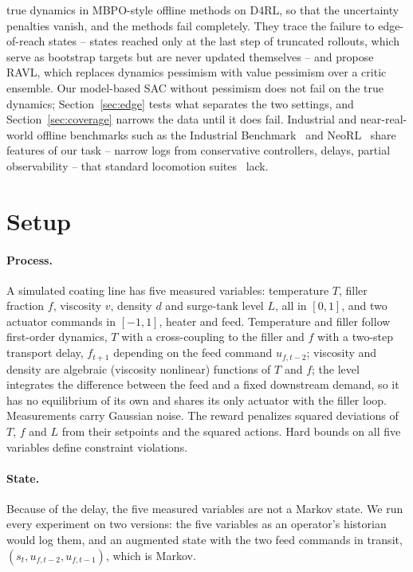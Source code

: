 \documentclass[11pt]{article}
\begin{document}
true dynamics in MBPO-style offline methods on D4RL, so that the uncertainty penalties vanish, and the methods fail completely. They trace the failure to edge-of-reach states -- states reached only at the last step of truncated rollouts, which serve as bootstrap targets but are never updated themselves -- and propose RAVL, which replaces dynamics pessimism with value pessimism over a critic ensemble. Our model-based SAC without pessimism does not fail on the true dynamics; Section~\ref{sec:edge} tests what separates the two settings, and Section~\ref{sec:coverage} narrows the data until it does fail. Industrial and near-real-world offline benchmarks such as the Industrial Benchmark~\citep{hein2017industrial} and NeoRL~\citep{qin2022neorl} share features of our task -- narrow logs from conservative controllers, delays, partial observability -- that standard locomotion suites~\citep{fu2020d4rl} lack.

\section{Setup}

\paragraph{Process.} A simulated coating line has five measured variables: temperature $T$, filler fraction $f$, viscosity $v$, density $d$ and surge-tank level $L$, all in $[0,1]$, and two actuator commands in $[-1,1]$, heater and feed. Temperature and filler follow first-order dynamics, $T$ with a cross-coupling to the filler and $f$ with a two-step transport delay, $f_{t+1}$ depending on the feed command $u_{f,t-2}$; viscosity and density are algebraic (viscosity nonlinear) functions of $T$ and $f$; the level integrates the difference between the feed and a fixed downstream demand, so it has no equilibrium of its own and shares its only actuator with the filler loop. Measurements carry Gaussian noise. The reward penalizes squared deviations of $T$, $f$ and $L$ from their setpoints and the squared actions. Hard bounds on all five variables define constraint violations.

\paragraph{State.} Because of the delay, the five measured variables are not a Markov state. We run every experiment on two versions: the five variables as an operator's historian would log them, and an augmented state with the two feed commands in transit, $(s_t, u_{f,t-2}, u_{f,t-1})$, which is Markov.
\end{document}
